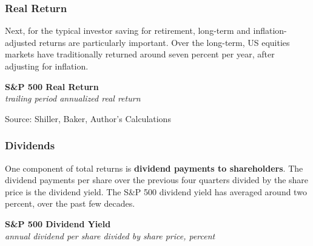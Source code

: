 \documentclass{report}
\makeatletter
\newcommand{\tbllink}[1]{\href{https://raw.githubusercontent.com/bdecon/US-chartbook/master/chartbook/data/#1}{\faTable}}
\newcommand*\short[1]{\expandafter\@gobbletwo\number\numexpr#1\relax}
\newcommand{\dateaxisticks}{
		date coordinates in=x, axis line style={draw=none},
		xmax={2024-01-31},
		max space between ticks=40,	    
		xtick={{1990-01-01}, {1992-01-01}, {1994-01-01}, 
			{1996-01-01}, {1998-01-01}, {2000-01-01}, 
			{2002-01-01}, {2004-01-01}, {2006-01-01},
			{2008-01-01}, {2010-01-01}, {2012-01-01}, {2014-01-01},
		    {2016-01-01}, {2018-01-01}, {2020-01-01}, {2022-01-01}, 
		    {2024-01-01}, {2026-01-01}},
		minor xtick={{1989-01-01}, {1991-01-01}, {1993-01-01},
			{1995-01-01}, {1997-01-01}, {1999-01-01}, 
			{2001-01-01}, {2003-01-01}, {2005-01-01}, {2007-01-01},
		    {2009-01-01}, {2011-01-01}, {2013-01-01}, {2015-01-01},
		    {2017-01-01}, {2019-01-01}, {2021-01-01}, {2023-01-01}, 
		    {2025-01-01}, {2027-01-01}},
		enlarge y limits={0.06}, enlarge x limits={0.01},
		xticklabel style={align=center, yshift=-2pt}, tick label style={inner sep=0pt},
		}
\newcommand{\bbar}[2]{extra #1 ticks = {{#2}}, extra #1 tick labels = ,
		extra #1 tick style = {grid=major, grid style={thick, black!25}},}
\newcommand{\thickline}[4]{\addplot[ultra thick, no markers, color=#1] 
		table [x=#2, y=#3, col sep=comma] {#4};	}
\newcommand{\rbars}{
		\fill[color=black!10] (axis cs:{1990-07-01},\pgfkeysvalueof{/pgfplots/ymin})
			rectangle (axis cs:{1991-03-01}, \pgfkeysvalueof{/pgfplots/ymax});
		\fill[color=black!10] (axis cs:{2007-12-01},\pgfkeysvalueof{/pgfplots/ymin})
			rectangle (axis cs:{2009-07-01}, \pgfkeysvalueof{/pgfplots/ymax});
		\fill[color=black!10] (axis cs:{2001-03-01},\pgfkeysvalueof{/pgfplots/ymin})
			rectangle (axis cs:{2001-11-01}, \pgfkeysvalueof{/pgfplots/ymax});
		\fill[color=black!10] (axis cs:{2020-02-01},\pgfkeysvalueof{/pgfplots/ymin})
			rectangle (axis cs:{2020-05-01}, \pgfkeysvalueof{/pgfplots/ymax});}
\makeatother
\begin{document}
{\begin{minipage}{1.0\textwidth}
\subsubsection*{Real Return}
\small Next, for the typical investor saving for retirement, long-term and inflation-adjusted returns are particularly important. Over the long-term, US equities markets have traditionally returned around seven percent per year, after adjusting for inflation. 

  
\vspace{2mm}

\normalsize \textbf{S\&P 500 Real Return}\\
\footnotesize{\textit{trailing period annualized real return}}
\vspace{3.5cm}

\hspace{2mm} 

\footnotesize{Source: Shiller, Baker, Author's Calculations} \hfill \tbllink{sp500rr.csv}
\vspace{1mm}

\subsubsection*{Dividends}
\small One component of total returns is \textbf{dividend payments to shareholders}. The dividend payments per share over the previous four quarters divided by the share price is the dividend yield. The S\&P 500 dividend yield has averaged around two percent, over the past few decades.


\vspace{1mm}

\normalsize \textbf{S\&P 500 Dividend Yield}\\
\footnotesize{\textit{annual dividend per share divided by share price, percent}}
\vspace{2.9cm}


\end{minipage}}
\end{document}
